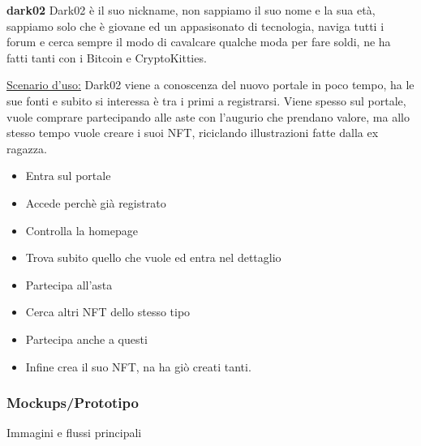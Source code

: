 \bigbreak
\noindent
\textbf{dark02}
\bigbreak
\noindent
Dark02 è il suo nickname, non sappiamo il suo nome e la sua età, sappiamo solo che è giovane ed un appasisonato di tecnologia,
naviga tutti i forum e cerca sempre il modo di cavalcare qualche moda per fare soldi, 
ne ha fatti tanti con i Bitcoin e CryptoKitties.

\underline{Scenario d'uso:}
Dark02 viene a conoscenza del nuovo portale in poco tempo, ha le sue fonti e subito si interessa è tra i primi a registrarsi.
Viene spesso sul portale, vuole comprare partecipando alle aste con l'augurio che prendano valore, ma allo stesso tempo vuole creare i suoi NFT, 
riciclando illustrazioni fatte dalla ex ragazza.

\begin{itemize}
	\item Entra sul portale
	\item Accede perchè già registrato
	\item Controlla la homepage
	\item Trova subito quello che vuole ed entra nel dettaglio
	\item Partecipa all'asta
	\item Cerca altri NFT dello stesso tipo
	\item Partecipa anche a questi
	\item Infine crea il suo NFT, na ha giò creati tanti.
\end{itemize}

\subsubsection{Mockups/Prototipo}
Immagini e flussi principali

